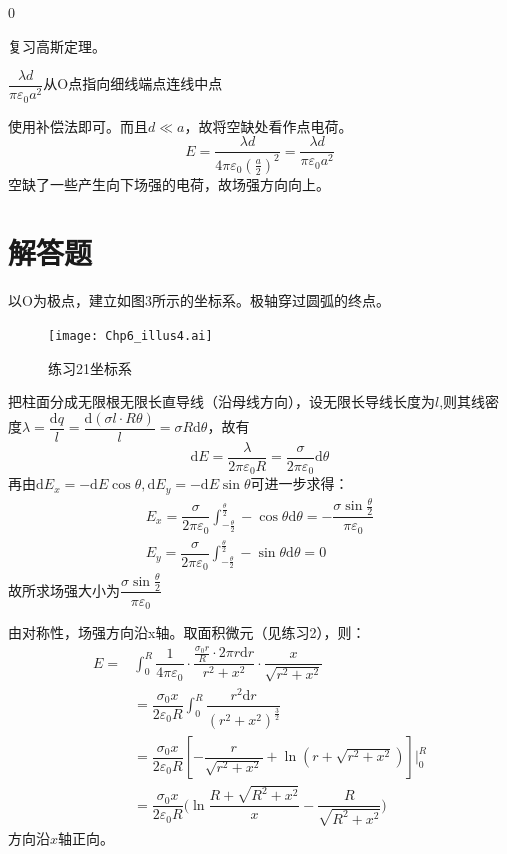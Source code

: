 \documentclass[b5paper,opensource,sourcefont,parskip]{qyxf-book}
\newcommand{\di}[1]{\mathrm{d}#1}
\begin{document}
0

\solve
复习高斯定理。

$\dfrac{\lambda d}{\pi\varepsilon_0 a^2}$\quad 从O点指向细线端点连线中点

\solve
使用补偿法即可。而且$d\ll a$，故将空缺处看作点电荷。
\[
E=\dfrac{\lambda d}{4\pi\varepsilon_0{(\frac{a}{2})}^2}=\dfrac{\lambda d}{\pi\varepsilon_0 a^2}
\]
空缺了一些产生向下场强的电荷，故场强方向向上。

\section{解答题}



\solve
以O为极点，建立如图3所示的坐标系。极轴穿过圆弧的终点。
\begin{figure}[!htbp]
	\centering
	\texttt{[image: Chp6\_illus4.ai]}
	\caption{练习21\quad 坐标系}
\end{figure}
把柱面分成无限根无限长直导线（沿母线方向），设无限长导线长度为$l$,则其线密度$\lambda=\dfrac{\di{q}}{l}=\dfrac{\di{(\sigma l\cdot R\theta)}}{l}=\sigma R\di{\theta}$，故有
\[\di{E}=\dfrac{\lambda}{2\pi\varepsilon_0R}=\dfrac{\sigma}{2\pi\varepsilon_0}\di{\theta}\]
再由$\di{E_x}=-\di{E}\cos\theta,\di{E_y}=-\di{E}\sin\theta$可进一步求得：
\begin{gather*}
	E_x=\dfrac{\sigma}{2\pi\varepsilon_0}\int_{-\frac{\theta}{2}}^{\frac{\theta}{2}}-\cos\theta\di{\theta}=-\dfrac{\sigma\sin\frac{\theta}{2}}{\pi\varepsilon_0}\\
	E_y=\dfrac{\sigma}{2\pi\varepsilon_0}\int_{-\frac{\theta}{2}}^{\frac{\theta}{2}}-\sin\theta\di{\theta}=0
\end{gather*}
故所求场强大小为$\dfrac{\sigma\sin\frac{\theta}{2}}{\pi\varepsilon_0}$


\solve
由对称性，场强方向沿x轴。取面积微元（见练习2），则：
\begin{align*}
	E=&\int_0^R\dfrac{1}{4\pi\varepsilon_0}\cdot\dfrac{\frac{\sigma_0r}{R}\cdot 2\pi r\di{r}}{r^2+x^2}\cdot\dfrac{x}{\sqrt{r^2+x^2}}\\
	&=\dfrac{\sigma_0x}{2\varepsilon_0R}\int_0^R\dfrac{r^2\di{r}}{{(r^2+x^2)}^\frac{3}{2}}\\
	&=\dfrac{\sigma_0x}{2\varepsilon_0R}[-\dfrac{r}{\sqrt{r^2+x^2}}+\ln(r+\sqrt{r^2+x^2})]\Big|_0^R\\
	&=\dfrac{\sigma_0x}{2\varepsilon_0R}\big(\ln\dfrac{R+\sqrt{R^2+x^2}}{x}-\dfrac{R}{\sqrt{R^2+x^2}}\big)
\end{align*}
方向沿$x$轴正向。
\end{document}
